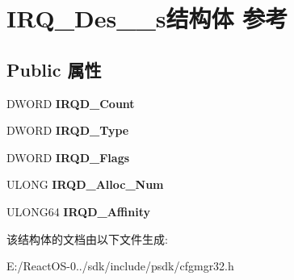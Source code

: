 \hypertarget{struct_i_r_q___des__64__s}{}\section{I\+R\+Q\+\_\+\+Des\+\_\+\_\+s结构体 参考}
\label{struct_i_r_q___des__64__s}
\subsection*{Public 属性}
\begin{DoxyCompactItemize}
\item 
\mbox{\label{struct_i_r_q___des__64__s_a638a8927243092d9f1320c313bb057d6}} 
D\+W\+O\+RD {\bfseries I\+R\+Q\+D\+\_\+\+Count}
\item 
\mbox{\label{struct_i_r_q___des__64__s_a6cae3180ec512ec5ada562bda0d515c2}} 
D\+W\+O\+RD {\bfseries I\+R\+Q\+D\+\_\+\+Type}
\item 
\mbox{\label{struct_i_r_q___des__64__s_a920fc1c6a13ebfd3105a5ee965a40dc4}} 
D\+W\+O\+RD {\bfseries I\+R\+Q\+D\+\_\+\+Flags}
\item 
\mbox{\label{struct_i_r_q___des__64__s_ad0a794b0f1a09edbfe92206ac56a030c}} 
U\+L\+O\+NG {\bfseries I\+R\+Q\+D\+\_\+\+Alloc\+\_\+\+Num}
\item 
\mbox{\label{struct_i_r_q___des__64__s_a707f27810b25e0caf4b8209399dcd9d8}} 
U\+L\+O\+N\+G64 {\bfseries I\+R\+Q\+D\+\_\+\+Affinity}
\end{DoxyCompactItemize}


该结构体的文档由以下文件生成\+:\begin{DoxyCompactItemize}
\item 
E\+:/\+React\+O\+S-\/0../sdk/include/psdk/cfgmgr32.\+h\end{DoxyCompactItemize}
